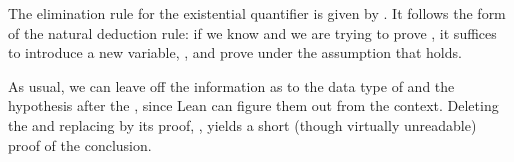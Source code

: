 \documentclass[letterpaper,10pt,english]{sphinxmanual}
\begin{document}
\sphinxAtStartPar
The elimination rule for the existential quantifier is given by .
It follows the form of the natural deduction rule:
if we know  and we are trying to prove ,
it suffices to introduce a new variable, ,
and prove  under the assumption that  holds.

\begin{sphinxVerbatim}[commandchars=\\\{\}]
   
     
   

                 
 
          
           
      
\end{sphinxVerbatim}

\sphinxAtStartPar
As usual, we can leave off the information as to the data type of  and the hypothesis  after the , since Lean can figure them out from the context. Deleting the  and replacing  by its proof, , yields a short (though virtually unreadable) proof of the conclusion.

\begin{sphinxVerbatim}[commandchars=\\\{\}]
                 
 
        
\end{sphinxVerbatim}
\end{document}
